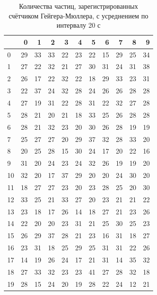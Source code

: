 \documentclass[12pt]{article}
\begin{document}
\begin{table}[H]
    \begin{center}
        \begin{tabular}{|l|r|r|r|r|r|r|r|r|r|r|}
            \hline
               & 0  & 1  & 2  & 3  & 4  & 5  & 6  & 7  & 8  & 9  \\
            \hline
            0  & 29 & 33 & 33 & 22 & 23 & 22 & 15 & 29 & 25 & 34 \\
            1  & 27 & 22 & 32 & 21 & 27 & 30 & 31 & 24 & 31 & 38 \\
            2  & 26 & 17 & 22 & 32 & 22 & 18 & 29 & 33 & 23 & 31 \\
            3  & 22 & 37 & 24 & 32 & 28 & 24 & 26 & 26 & 28 & 28 \\
            4  & 27 & 19 & 31 & 22 & 28 & 31 & 22 & 32 & 27 & 28 \\
            5  & 28 & 21 & 20 & 21 & 18 & 33 & 25 & 26 & 28 & 28 \\
            6  & 28 & 21 & 32 & 23 & 20 & 30 & 26 & 28 & 19 & 19 \\
            7  & 25 & 27 & 27 & 20 & 29 & 37 & 32 & 28 & 33 & 20 \\
            8  & 20 & 25 & 28 & 15 & 30 & 24 & 17 & 20 & 22 & 16 \\
            9  & 31 & 20 & 24 & 23 & 24 & 32 & 26 & 19 & 19 & 20 \\
            10 & 32 & 20 & 17 & 37 & 29 & 20 & 20 & 24 & 30 & 20 \\
            11 & 18 & 27 & 27 & 23 & 20 & 23 & 28 & 25 & 20 & 30 \\
            12 & 33 & 25 & 21 & 33 & 27 & 20 & 23 & 21 & 21 & 22 \\
            13 & 23 & 18 & 17 & 26 & 14 & 18 & 27 & 21 & 23 & 26 \\
            14 & 22 & 20 & 20 & 23 & 31 & 21 & 25 & 30 & 25 & 23 \\
            15 & 26 & 29 & 37 & 28 & 21 & 23 & 16 & 31 & 18 & 27 \\
            16 & 23 & 31 & 18 & 25 & 29 & 25 & 31 & 31 & 22 & 26 \\
            17 & 14 & 19 & 26 & 24 & 17 & 21 & 31 & 14 & 35 & 32 \\
            18 & 27 & 33 & 32 & 23 & 23 & 41 & 27 & 28 & 32 & 18 \\
            19 & 28 & 15 & 24 & 20 & 19 & 28 & 22 & 24 & 12 & 21 \\
            \hline
        \end{tabular}
    \end{center}
    \caption{Количества частиц, зарегистрированных счётчиком Гейгера-Мюллера, с усреднением по интервалу 20 с}
    \label{tab:2}
\end{table}
\end{document}
